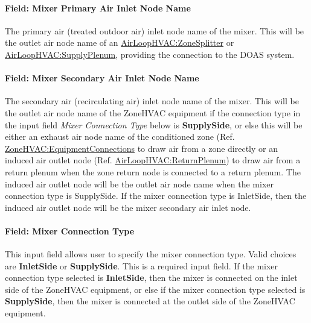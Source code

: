 \paragraph{Field: Mixer Primary Air Inlet Node Name}\label{field-mixer-primary-air-inlet-node-name}

The primary air (treated outdoor air) inlet node name of the mixer. This will be the outlet air node name of an \hyperref[airloophvaczonesplitter]{AirLoopHVAC:ZoneSplitter} or \hyperref[airloophvacsupplyplenum]{AirLoopHVAC:SupplyPlenum}, providing the connection to the DOAS system.

\paragraph{Field: Mixer Secondary Air Inlet Node Name}\label{field-mixer-secondary-air-inlet-node-name}

The secondary air (recirculating air) inlet node name of the mixer. This will be the outlet air node name of the ZoneHVAC equipment if the connection type in the input field \textit{Mixer Connection Type} below is \textbf{SupplySide}, or else this will be either an exhaust air node name of the conditioned zone (Ref. \hyperref[zonehvacequipmentconnections]{ZoneHVAC:EquipmentConnections} to draw air from a zone directly or an induced air outlet node (Ref. \hyperref[airloophvacreturnplenum]{AirLoopHVAC:ReturnPlenum}) to draw air from a return plenum when the zone return node is connected to a return plenum.  The induced air outlet node will be the outlet air node name when the mixer connection type is SupplySide. If the mixer connection type is InletSide, then the induced air outlet node will be the mixer secondary air inlet node.

\paragraph{Field: Mixer Connection Type}\label{field-mixer-connection-type}

This input field allows user to specify the mixer connection type. Valid choices are \textbf{InletSide} or \textbf{SupplySide}. This is a required input field. If the mixer connection type selected is \textbf{InletSide}, then the mixer is connected on the inlet side of the ZoneHVAC equipment, or else if the mixer connection type selected is \textbf{SupplySide}, then the mixer is connected at the outlet side of the ZoneHVAC equipment.\\

